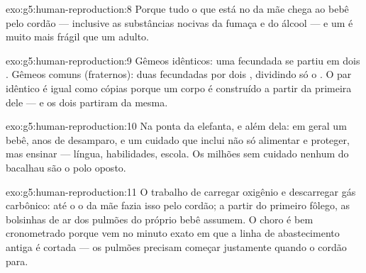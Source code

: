 \begin{solution}{exo:g5:human-reproduction:8}
Porque tudo o que está no  da mãe chega ao bebê pelo cordão ---
inclusive as substâncias nocivas da fumaça e do álcool --- e um 
é muito mais frágil que um adulto.
\end{solution}

\begin{solution}{exo:g5:human-reproduction:9}
Gêmeos idênticos: uma  fecundada se
partiu em dois . Gêmeos comuns (fraternos): duas  fecundadas por dois ,
dividindo só o . O par idêntico é igual como cópias porque um
corpo é construído a partir da primeira  dele --- e os dois
partiram da mesma.
\end{solution}

\begin{solution}{exo:g5:human-reproduction:10}
Na ponta da elefanta, e além dela: em geral um bebê, anos de
desamparo, e um cuidado que inclui não só alimentar e proteger, mas
ensinar --- língua, habilidades, escola. Os milhões sem cuidado
nenhum do bacalhau são o polo oposto.
\end{solution}

\begin{solution}{exo:g5:human-reproduction:11}
O trabalho de carregar oxigênio e descarregar gás carbônico: até o
 o  da mãe fazia isso pelo cordão; a partir do
primeiro fôlego, as bolsinhas de ar dos pulmões do próprio bebê
assumem. O choro é bem cronometrado porque vem no minuto exato em
que a linha de abastecimento antiga é cortada --- os pulmões
precisam começar justamente quando o cordão para.
\end{solution}
